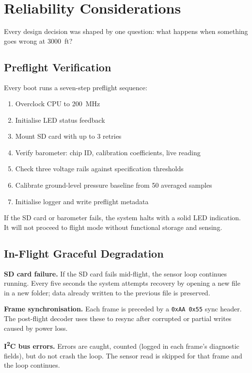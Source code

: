 \documentclass[11pt, a4paper]{article}
\begin{document}
\section{Reliability Considerations}

Every design decision was shaped by one question: what happens when something goes wrong at \SI{3000}{ft}?

\subsection{Preflight Verification}

Every boot runs a seven-step preflight sequence:

\begin{enumerate}
    \item Overclock CPU to \SI{200}{\mega\hertz}
    \item Initialise LED status feedback
    \item Mount SD card with up to 3 retries
    \item Verify barometer: chip ID, calibration coefficients, live reading
    \item Check three voltage rails against specification thresholds
    \item Calibrate ground-level pressure baseline from 50 averaged samples
    \item Initialise logger and write preflight metadata
\end{enumerate}

If the SD card or barometer fails, the system halts with a solid LED indication. It will not proceed to flight mode without functional storage and sensing.

\subsection{In-Flight Graceful Degradation}

\textbf{SD card failure.} If the SD card fails mid-flight, the sensor loop continues running. Every five seconds the system attempts recovery by opening a new file in a new folder; data already written to the previous file is preserved.

\textbf{Frame synchronisation.} Each frame is preceded by a \texttt{0xAA\,0x55} sync header. The post-flight decoder uses these to resync after corrupted or partial writes caused by power loss.

\textbf{I\textsuperscript{2}C bus errors.} Errors are caught, counted (logged in each frame's diagnostic fields), but do not crash the loop. The sensor read is skipped for that frame and the loop continues.
\end{document}
